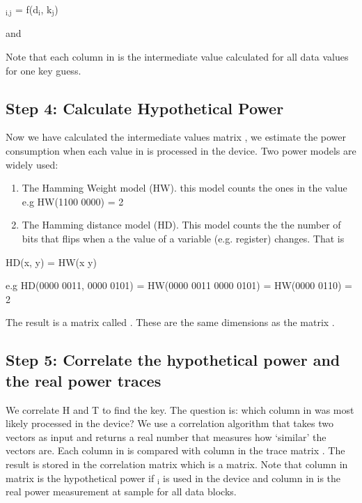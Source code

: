 \documentclass[letterpaper,10pt,english]{sphinxmanual}
\begin{document}
$_{\text{i,j}}$ = f(d$_{\text{i}}$, k$_{\text{j}}$)

and 

Note that each column in  is the intermediate value calculated for all data values  for one key guess.


\subsection{Step 4: Calculate Hypothetical Power}
\label{\detokenize{cpa:step-4-calculate-hypothetical-power}}
Now we have calculated the intermediate values matrix , we estimate the power consumption when each value in  is processed in the device.
Two power models are widely used:
\begin{enumerate}
%
\item {} 
The Hamming Weight model (HW). this model counts the ones in the value e.g HW(1100 0000) = 2

\item {} 
The Hamming distance model (HD). This model counts the the number of bits that flips when a the value of a variable (e.g. register) changes. That is

\end{enumerate}

HD(x, y) = HW(x  y)

e.g HD(0000 0011, 0000 0101) = HW(0000 0011  0000 0101) = HW(0000 0110) = 2

The result is a  matrix called . These are the same dimensions as the matrix .


\subsection{Step 5: Correlate the hypothetical power and the real power traces}
\label{\detokenize{cpa:step-5-correlate-the-hypothetical-power-and-the-real-power-traces}}
We correlate H and T to find the key. The question is: which column in  was most likely processed in the device?
We use a correlation algorithm that takes two vectors as input and returns a real number that measures how ‘similar’ the vectors are.
Each column  in  is compared with column  in the trace matrix . The result is stored in the correlation matrix  which is a  matrix.
Note that column  in matrix  is the hypothetical power if $_{\text{i}}$ is used in the device and column  in  is the real power measurement at sample  for all data blocks.
\end{document}
